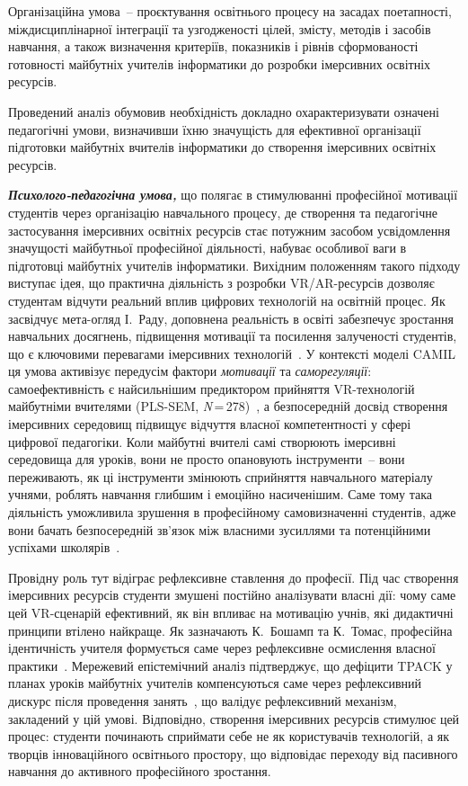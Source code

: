 Організаційна умова~-- проєктування освітнього процесу на засадах поетапності, міждисциплінарної інтеграції та узгодженості цілей, змісту, методів і засобів навчання, а також визначення критеріїв, показників і рівнів сформованості готовності майбутніх учителів інформатики до розробки імерсивних освітніх ресурсів.

Проведений аналіз обумовив необхідність докладно охарактеризувати означені педагогічні умови, визначивши їхню значущість для ефективної організації підготовки майбутніх вчителів інформатики до створення імерсивних освітніх ресурсів.

\emph{\textbf{Психолого-педагогічна умова,}} що полягає в стимулюванні професійної мотивації студентів через організацію навчального процесу, де створення та педагогічне застосування імерсивних освітніх ресурсів стає потужним засобом усвідомлення значущості майбутньої професійної діяльності, набуває особливої ваги в підготовці майбутніх учителів інформатики. Вихідним положенням такого підходу виступає ідея, що практична діяльність з розробки VR/AR-ресурсів дозволяє студентам відчути реальний вплив цифрових технологій на освітній процес. Як засвідчує мета-огляд І.~Раду, доповнена реальність в освіті забезпечує зростання навчальних досягнень, підвищення мотивації та посилення залученості студентів, що є ключовими перевагами імерсивних технологій~\cite{KMotivation2023}. У контексті моделі CAMIL ця умова активізує передусім фактори \emph{мотивації} та \emph{саморегуляції}: самоефективність є найсильнішим предиктором прийняття VR-технологій майбутніми вчителями (PLS-SEM, \textit{N}\,=\,278)~\cite{Xie2024UTAUT2VR}, а безпосередній досвід створення імерсивних середовищ підвищує відчуття власної компетентності у сфері цифрової педагогіки. Коли майбутні вчителі самі створюють імерсивні середовища для уроків, вони не просто опановують інструменти~-- вони переживають, як ці інструменти змінюють сприйняття навчального матеріалу учнями, роблять навчання глибшим і емоційно насиченішим. Саме тому така діяльність уможливила зрушення в професійному самовизначенні студентів, адже вони бачать безпосередній зв'язок між власними зусиллями та потенційними успіхами школярів~\cite[c.~112]{Krokos2019Virtual}.

Провідну роль тут відіграє рефлексивне ставлення до професії. Під час створення імерсивних ресурсів студенти змушені постійно аналізувати власні дії: чому саме цей VR-сценарій ефективний, як він впливає на мотивацію учнів, які дидактичні принципи втілено найкраще. Як зазначають К.~Бошамп та К.~Томас, професійна ідентичність учителя формується саме через рефлексивне осмислення власної практики~\cite{ProfIdentity2024}. Мережевий епістемічний аналіз підтверджує, що дефіцити TPACK у планах уроків майбутніх учителів компенсуються саме через рефлексивний дискурс після проведення занять~\cite{Ga2024TPACKENA}, що валідує рефлексивний механізм, закладений у цій умові. Відповідно, створення імерсивних ресурсів стимулює цей процес: студенти починають сприймати себе не як користувачів технологій, а як творців інноваційного освітнього простору, що відповідає переходу від пасивного навчання до активного професійного зростання.

